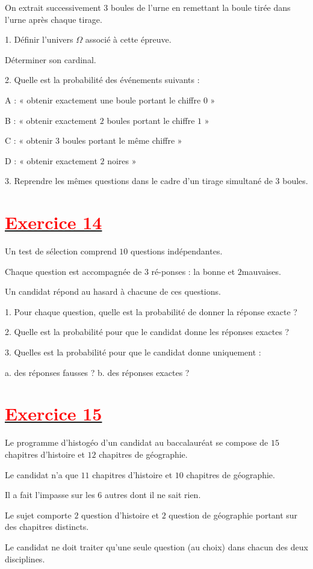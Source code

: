 \documentclass[12pt]{article}
\begin{document}
On extrait successivement $3$ boules de l'urne en remettant la boule tirée dans l'urne après chaque tirage.

1. Définir l'univers $\Omega$ associé à cette épreuve.

Déterminer son cardinal.

2. Quelle est la probabilité des événements suivants :

A : « obtenir exactement une boule portant le chiffre $0$ »

B : « obtenir exactement $2$ boules portant le chiffre $1$ »

C : « obtenir $3$ boules portant le même chiffre »

D : « obtenir exactement $2$ noires »

3. Reprendre les mêmes questions dans le cadre d'un tirage simultané de $3$ boules.
\section*{\underline{\textbf{\textcolor{red}{Exercice 14}}}}
Un test de sélection comprend $10$ questions indépendantes.

Chaque question est accompagnée de $3$ ré-ponses : la bonne et $2$mauvaises. 

Un candidat répond au hasard à chacune de ces questions.

1. Pour chaque question, quelle est la probabilité de donner la réponse exacte ?
	
2. Quelle est la probabilité pour que le candidat donne les réponses exactes ?

3. Quelles est la probabilité pour que le candidat donne uniquement :

a. des réponses fausses ? b. des réponses exactes ?
\section*{\underline{\textbf{\textcolor{red}{Exercice 15}}}}
Le programme d'histogéo d'un candidat au baccalauréat se compose de $15$ chapitres d'histoire et $12$ chapitres de géographie.

Le candidat n'a que $11$ chapitres d'histoire et $10$ chapitres de géographie.
	
Il a fait l'impasse sur les $6$ autres dont il ne sait rien.

Le sujet comporte $2$ question d'histoire et $2$ question de géographie portant sur des chapitres distincts.

Le candidat ne doit traiter qu'une seule question (au choix) dans chacun des deux disciplines. 
\end{document}
